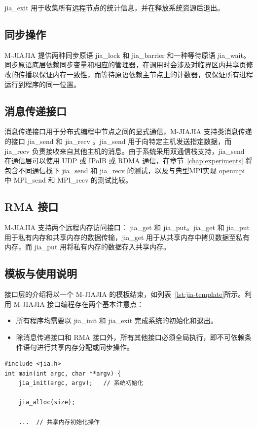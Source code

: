{jia\_exit 用于收集所有远程节点的统计信息，并在释放系统资源后退出。
\subsection{同步操作}
M-JIAJIA 提供两种同步原语 jia\_lock 和 jia\_barrier 和一种等待原语 jia\_wait。同步原语底层依赖同步变量和相应的管理器，在调用时会涉及对临界区内共享页修改的传播以保证内存一致性，而等待原语依赖主节点上的计数器，仅保证所有进程运行到程序的同一位置。

\subsection{消息传递接口}
消息传递接口用于分布式编程中节点之间的显式通信，M-JIAJIA 支持类消息传递的接口 jia\_send 和 jia\_recv 。jia\_send 用于向特定主机发送指定数据，而 jia\_recv 负责接收来自其他主机的消息。由于系统采用双通信栈支持，jia\_send 在通信层可以使用 UDP 或 IPoIB 或 RDMA 通信，在章节~\ref{chap:experiments} 将包含不同通信栈下 jia\_send 和 jia\_recv 的测试，以及与典型MPI实现 openmpi 中 MPI\_send 和 MPI\_recv 的测试比较。

\subsection{RMA 接口}
M-JIAJIA 支持两个远程内存访问接口： jia\_get 和 jia\_put。jia\_get 和 jia\_put 用于私有内存和共享内存的数据传输，jia\_get 用于从共享内存中拷贝数据至私有内存，而 jia\_put 用将私有内存的数据存入共享内存。
\subsection{模板与使用说明}
接口层的介绍将以一个 M-JIAJIA 的模板结束，如列表~\ref{lst:jia-template}所示。利用 M-JIAJIA 接口编程存在两个基本注意点：
\begin{itemize}
    \item 所有程序均需要以 jia\_init 和 jia\_exit 完成系统的初始化和退出。
    \item 除消息传递接口和 RMA 接口外，所有其他接口必须全局执行，即不可依赖条件语句进行共享内存分配或同步操作。
\end{itemize}
\begin{lstlisting}[style=CStyle, caption={M-JIAJIA 应用模板}, label={lst:jia-template}]
#include <jia.h>
int main(int argc, char **argv) {
    jia_init(argc, argv);   // 系统初始化

    jia_alloc(size);
    
    ...  // 共享内存初始化操作


\end{lstlisting}}
